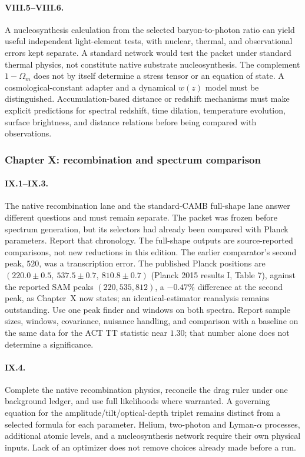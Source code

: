 \paragraph{VIII.5--VIII.6.}
A nucleosynthesis calculation from the selected baryon-to-photon ratio can yield useful independent light-element tests, with nuclear, thermal, and observational errors kept separate. A standard network would test the packet under standard thermal physics, not constitute native substrate nucleosynthesis. The complement $1-\Omega_m$ does not by itself determine a stress tensor or an equation of state. A cosmological-constant adapter and a dynamical $w(z)$ model must be distinguished. Accumulation-based distance or redshift mechanisms must make explicit predictions for spectral redshift, time dilation, temperature evolution, surface brightness, and distance relations before being compared with observations.

\subsubsection*{Chapter X: recombination and spectrum comparison}

\paragraph{IX.1--IX.3.}
The native recombination lane and the standard-CAMB full-shape lane answer different questions and must remain separate. The packet was frozen before spectrum generation, but its selectors had already been compared with Planck parameters. Report that chronology. The full-shape outputs are source-reported comparisons, not new reductions in this edition. The earlier comparator's second peak, $520$, was a transcription error. The published Planck positions are $(220.0\pm0.5,\ 537.5\pm0.7,\ 810.8\pm0.7)$ (Planck 2015 results I, Table 7), against the reported SAM peaks $(220,535,812)$, a $-0.47\%$ difference at the second peak, as Chapter~X now states; an identical-estimator reanalysis remains outstanding. Use one peak finder and windows on both spectra. Report sample sizes, windows, covariance, nuisance handling, and comparison with a baseline on the same data for the ACT TT statistic near $1.30$; that number alone does not determine a significance.

\paragraph{IX.4.}
Complete the native recombination physics, reconcile the drag ruler under one background ledger, and use full likelihoods where warranted. A governing equation for the amplitude/tilt/optical-depth triplet remains distinct from a selected formula for each parameter. Helium, two-photon and Lyman-$\alpha$ processes, additional atomic levels, and a nucleosynthesis network require their own physical inputs. Lack of an optimizer does not remove choices already made before a run.

